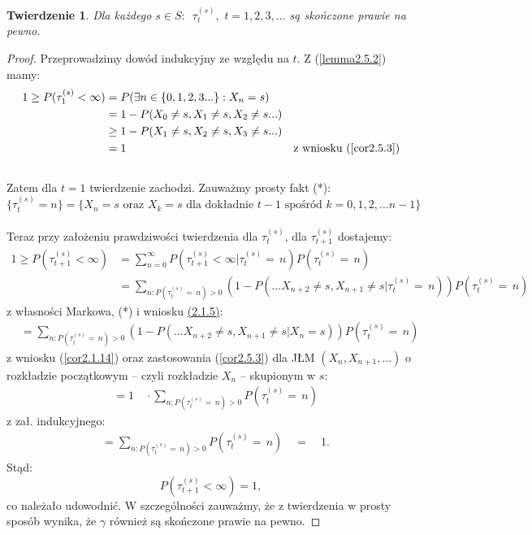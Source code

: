 \documentclass[a4paper]{article}
\theoremstyle{defn}
\theoremstyle{theorem}
\newtheorem{theorem}[defn]{Twierdzenie}
\theoremstyle{lemma}
\theoremstyle{cor}
\theoremstyle{fact}
\begin{document}
\begin{theorem}\label{theorem2.5.4}
Dla każdego $s\in S: \,\,\, \tau_t^{(s)}, \,\, t = 1, 2, 3, ...$ są skończone prawie na pewno.
\end{theorem}
\begin{proof}
Przeprowadzimy dowód indukcyjny ze względu na $t$. Z (\ref{lemma2.5.2}) mamy:
\begin{align*}
1 \geq P(\tau_1^{(s)}< \infty) &= P(\exists n \in \{0,1,2,3...\}: X_n = s) \\
&= 1 - P(X_0 \neq s, X_{1} \neq s, X_2 \neq s ...) \\
&\geq 1 - P(X_1 \neq s, X_{2} \neq s, X_3 \neq s ...) \\
&= 1 & \text{z wniosku (\ref{cor2.5.3})}
\end{align*}
\\
Zatem dla $t=1$ twierdzenie zachodzi. Zauważmy prosty fakt (*):
$$\{\tau_t^{(s)} = n\} = \{X_n = s \,\,\text{oraz}\,\, X_k = s \,\, \text{dla dokładnie}\,\, t-1\,\, \text{spośród}\,\, k = 0,1,2,...n-1\}$$
\\
Teraz przy założeniu prawdziwości twierdzenia dla $\tau_{t}^{(s)}$, dla $\tau_{t+1}^{(s)}$ dostajemy: \\
\begin{align*}
1 \geq P(\tau_{t+1}^{(s)} < \infty) &= \sum_{n = 0}^{\infty} P(\tau_{t+1}^{(s)} < \infty| \tau_{t}^{(s)} =\, n)P(\tau_{t}^{(s)} =\, n)\\
&= \sum_{n: P(\tau_{t}^{(s)} = \, n) > 0} (1 - P(... X_{n+2} \neq s, X_{n+1} \neq s| \tau_{t}^{(s)} = \, n)) P(\tau_{t}^{(s)} = \, n)
\end{align*}
z własności Markowa, (*) i wniosku \hyperref[cor2.1.5]{(2.1.5)}:
\begin{align*}
&= \sum_{n: P(\tau_{t}^{(s)} = \, n) > 0} (1 - P(... X_{n+2} \neq s, X_{n+1} \neq s |X_n = s)) P(\tau_{t}^{(s)} = \, n)
\end{align*}
z wniosku (\ref{cor2.1.14}) oraz zastosowania (\ref{cor2.5.3}) dla JŁM $(X_n, X_{n+1}, ...)$ o rozkładzie początkowym – czyli rozkładzie $X_n$ – skupionym w $s$:
\begin{align*}
&= 1 \quad \cdot \sum_{n: P(\tau_{t}^{(s)} = \, n) > 0} P(\tau_{t}^{(s)} = \, n)
\end{align*}
z zał. indukcyjnego:
\begin{align*}
&= \sum_{n: P(\tau_{t}^{(s)} =\, n) > 0} P(\tau_{t}^{(s)} = \, n) \quad = \quad 1.
\end{align*}
Stąd:
$$P(\tau_{t+1}^{(s)} < \infty) = 1,$$
co należało udowodnić. W szczególności zauważmy, że z twierdzenia w prosty sposób wynika, że $\gamma$ również są skończone prawie na pewno.
\end{proof}
\end{document}
